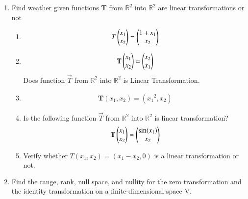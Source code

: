 \renewcommand{\theequation}{\theenumi}
\renewcommand{\thefigure}{\theenumi}
\begin{enumerate}[label=\thesubsection.\arabic*.,ref=\thesubsection.\theenumi]
%
\item  Find weather given  functions \textbf{T} from $\mathbb{R}^2$ into $\mathbb{R}^2$ are linear transformations or not

\begin{enumerate}
\item 
\begin{align}
    T\begin{pmatrix}x_1\\x_2\end{pmatrix}=\begin{pmatrix}1+x_1\\x_2\end{pmatrix}
\label{eq:solutions/3/1/1/a/1}
\end{align}
\solution

%
\item \begin{align}
\mathbf{T}\begin{pmatrix}x_1\\x_2\end{pmatrix}= \begin{pmatrix}x_2\\ x_1\end{pmatrix} \label{eq:solutions/3/1/1/b/0}
\end{align}
Does function $\vec{T}$ from $\mathbb{R}^2$ into $\mathbb{R}^2$ is Linear Transformation.

\solution

%
\item 
\begin{align}
	\textbf{T}(x_1,x_2) = ({x_1}^2,x_2)
\end{align}

\solution

%
\item Is the following function $\vec{T}$ from $\mathbb{R}^2$ into $\mathbb{R}^2$  is linear transformation?
\begin{align}
\mathbf{T} 
\begin{pmatrix}
x_1\\
x_2\end{pmatrix}
= 
\begin{pmatrix}\sin (x_1)\\x_2\end{pmatrix} \nonumber\end{align}
%
%
\solution

%
\item Verify whether $T(x_1, x_2)  = (x_1 - x_2, 0)$ is a linear transformation or not.
%
\solution


\end{enumerate}
%
\item Find the range, rank, null space, and nullity for the zero transformation and the identity transformation on a finite-dimensional space V. 
%
\\
\solution



\end{enumerate}

